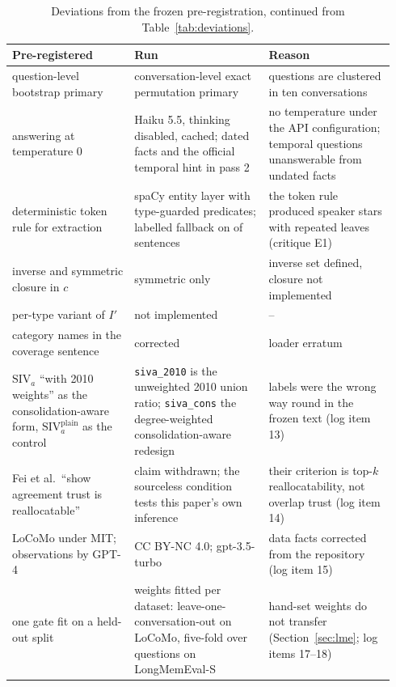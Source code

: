 \documentclass{ceurart}
\newcommand{\Implog}{I'}
\newcommand{\SIVa}{\mathrm{SIV}_a}
\newcommand{\SIVaplain}{\mathrm{SIV}_a^{\mathrm{plain}}}
\newcommand{\cons}{c}
\newcommand{\code}[1]{\texttt{#1}}
\begin{document}
\begin{table}[tp]
  \centering
  \caption{Deviations from the frozen pre-registration, continued from Table~\ref{tab:deviations}.}
  \label{tab:deviations2}
  \small
  \begin{tabular}{@{}p{0.3\linewidth}p{0.33\linewidth}p{0.31\linewidth}@{}}
    \toprule
    Pre-registered & Run & Reason \\
    \midrule
    question-level bootstrap primary & conversation-level exact permutation primary & questions are clustered in ten conversations \\
    answering at temperature 0 & Haiku 5.5, thinking disabled, cached; dated facts and the official temporal hint in pass 2 & no temperature under the API configuration; temporal questions unanswerable from undated facts \\
    deterministic token rule for extraction & spaCy entity layer with type-guarded predicates; labelled fallback on \extFallbackShare{} of sentences & the token rule produced speaker stars with repeated leaves (critique E1) \\
    inverse and symmetric closure in $\cons$ & symmetric only & inverse set defined, closure not implemented \\
    per-type variant of $\Implog$ & not implemented & -- \\
    category names in the coverage sentence & corrected & loader erratum \\
    $\SIVa$ ``with 2010 weights'' as the consolidation-aware form, $\SIVaplain$ as the control & \code{siva\_2010} is the unweighted 2010 union ratio; \code{siva\_cons} the degree-weighted consolidation-aware redesign & labels were the wrong way round in the frozen text (log item 13) \\
    Fei et al.\ ``show agreement trust is reallocatable'' & claim withdrawn; the sourceless condition tests this paper's own inference & their criterion is top-$k$ reallocatability, not overlap trust (log item 14) \\
    LoCoMo under MIT; observations by GPT-4 & CC BY-NC 4.0; gpt-3.5-turbo & data facts corrected from the repository (log item 15) \\
    one gate fit on a held-out split & weights fitted per dataset: leave-one-conversation-out on LoCoMo, five-fold over questions on LongMemEval-S & hand-set weights do not transfer (Section~\ref{sec:lme}; log items 17--18) \\
    \bottomrule
  \end{tabular}
\end{table}
\end{document}
